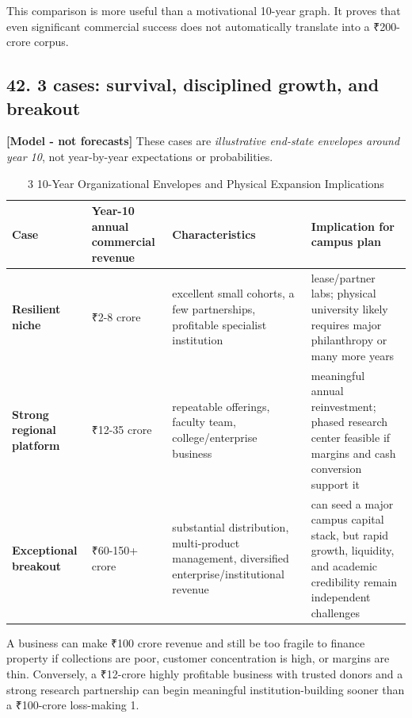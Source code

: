 This comparison is more useful than a motivational 10-year graph. It proves that even significant commercial success does not automatically translate into a \textnormal{₹}200-crore corpus.

\subsection{42. 3 cases: survival, disciplined growth, and breakout}

\textbf{[Model - not forecasts]} These cases are \textit{illustrative end-state envelopes around year 10}, not year-by-year expectations or probabilities.

\begin{table}[t]
\centering
\small
\caption{3 10-Year Organizational Envelopes and Physical Expansion Implications}
\label{tab:ch36_three_cases}
\begin{tabularx}{\textwidth}{p{2.8cm} p{2.8cm} p{4.2cm} X}
\toprule
\textbf{ Case } & \textbf{ Year-10 annual commercial revenue } & \textbf{ Characteristics } & \textbf{ Implication for campus plan } \\
\midrule
 \textbf{Resilient niche}  &  \textnormal{₹}2-8 crore  &  excellent small cohorts, a few partnerships, profitable specialist institution  &  lease/\allowbreak partner labs; physical university likely requires major philanthropy or many more years  \\
 \textbf{Strong regional platform}  &  \textnormal{₹}12-35 crore  &  repeatable offerings, faculty team, college/\allowbreak enterprise business  &  meaningful annual reinvestment; phased research center feasible if margins and cash conversion support it  \\
 \textbf{Exceptional breakout}  &  \textnormal{₹}60-150+ crore  &  substantial distribution, multi-product management, diversified enterprise/\allowbreak institutional revenue  &  can seed a major campus capital stack, but rapid growth, liquidity, and academic credibility remain independent challenges  \\
\bottomrule
\end{tabularx}
\end{table}

A business can make \textnormal{₹}100 crore revenue and still be too fragile to finance property if collections are poor, customer concentration is high, or margins are thin. Conversely, a \textnormal{₹}12-crore highly profitable business with trusted donors and a strong research partnership can begin meaningful institution-building sooner than a \textnormal{₹}100-crore loss-making 1.

